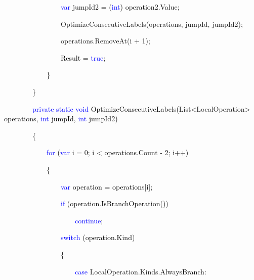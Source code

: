 \documentclass[letterpaper]{article}
\begin{document}
\textcolor{black}{\ \ \ \ \ \ \ \ \ \ \ \ \ \ \ \ }\textcolor{blue}{var}\textcolor{black}{ jumpId2 =
(}\textcolor{blue}{int}\textcolor{black}{) operation2.Value;}

{\color{black}
\ \ \ \ \ \ \ \ \ \ \ \ \ \ \ \ OptimizeConsecutiveLabels(operations, jumpId, jumpId2);}

{\color{black}
\ \ \ \ \ \ \ \ \ \ \ \ \ \ \ \ operations.RemoveAt(i + 1);}

\textcolor{black}{\ \ \ \ \ \ \ \ \ \ \ \ \ \ \ \ Result = }\textcolor{blue}{true}\textcolor{black}{;}

{\color{black}
\ \ \ \ \ \ \ \ \ \ \ \ \}}

{\color{black}
\ \ \ \ \ \ \ \ \}}


\bigskip

\textcolor{black}{\ \ \ \ \ \ \ \ }\textcolor{blue}{private}\textcolor{black}{
}\textcolor{blue}{static}\textcolor{black}{ }\textcolor{blue}{void}\textcolor{black}{
OptimizeConsecutiveLabels(}\textcolor[rgb]{0.16862746,0.5686275,0.6862745}{List}\textcolor{black}{{\textless}}\textcolor[rgb]{0.16862746,0.5686275,0.6862745}{LocalOperation}\textcolor{black}{{\textgreater}
operations, }\textcolor{blue}{int}\textcolor{black}{ jumpId, }\textcolor{blue}{int}\textcolor{black}{ jumpId2)}

{\color{black}
\ \ \ \ \ \ \ \ \{}

\textcolor{black}{\ \ \ \ \ \ \ \ \ \ \ \ }\textcolor{blue}{for}\textcolor{black}{
(}\textcolor{blue}{var}\textcolor{black}{ i = 0; i {\textless} operations.Count - 2; i++)}

{\color{black}
\ \ \ \ \ \ \ \ \ \ \ \ \{}

\textcolor{black}{\ \ \ \ \ \ \ \ \ \ \ \ \ \ \ \ }\textcolor{blue}{var}\textcolor{black}{ operation = operations[i];}

\textcolor{black}{\ \ \ \ \ \ \ \ \ \ \ \ \ \ \ \ }\textcolor{blue}{if}\textcolor{black}{
(operation.IsBranchOperation())}

\textcolor{black}{\ \ \ \ \ \ \ \ \ \ \ \ \ \ \ \ \ \ \ \ }\textcolor{blue}{continue}\textcolor{black}{;}

\textcolor{black}{\ \ \ \ \ \ \ \ \ \ \ \ \ \ \ \ }\textcolor{blue}{switch}\textcolor{black}{ (operation.Kind)}

{\color{black}
\ \ \ \ \ \ \ \ \ \ \ \ \ \ \ \ \{}

\textcolor{black}{\ \ \ \ \ \ \ \ \ \ \ \ \ \ \ \ \ \ \ \ }\textcolor{blue}{case}\textcolor{black}{
}\textcolor[rgb]{0.16862746,0.5686275,0.6862745}{LocalOperation}\textcolor{black}{.}\textcolor[rgb]{0.16862746,0.5686275,0.6862745}{Kinds}\textcolor{black}{.AlwaysBranch:}
\end{document}
